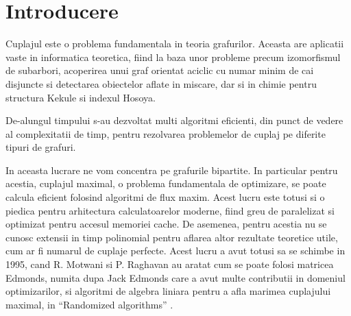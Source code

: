 \chapter{Introducere}

Cuplajul este o problema fundamentala in teoria grafurilor. Aceasta are
aplicatii vaste in informatica teoretica, fiind la baza unor probleme precum
izomorfismul de subarbori, acoperirea unui graf orientat aciclic cu numar minim
de cai disjuncte si detectarea obiectelor aflate in miscare, dar si in chimie
pentru structura Kekule si indexul Hosoya. \par %

De-alungul timpului s-au dezvoltat multi algoritmi eficienti, din punct de
vedere al complexitatii de timp, pentru rezolvarea problemelor de cuplaj pe
diferite tipuri de grafuri. \par

In aceasta lucrare ne vom concentra pe grafurile bipartite. In particular pentru
acestia, cuplajul maximal, o problema fundamentala de optimizare, se poate
calcula eficient folosind algoritmi de flux maxim. Acest lucru este totusi si o
piedica pentru arhitectura calculatoarelor moderne, fiind greu de paralelizat si
optimizat pentru accesul memoriei cache. De asemenea, pentru acestia nu se
cunosc extensii in timp polinomial pentru aflarea altor rezultate teoretice
utile, cum ar fi numarul de cuplaje perfecte. Acest lucru a avut totusi sa se
schimbe in 1995, cand R. Motwani si P. Raghavan au aratat cum se poate folosi
matricea Edmonds, numita dupa Jack Edmonds care a avut multe contributii in
domeniul optimizarilor, si algoritmi de algebra liniara pentru a afla marimea
cuplajului maximal, in ``Randomized algorithms'' \cite{randomizedalgorithms}. \par
